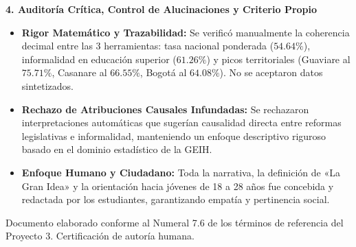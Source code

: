 \documentclass[10pt,letterpaper]{article}
\begin{document}
\vspace{2pt}

{\color{navy}\fontsize{10pt}{12pt}\selectfont \textbf{4. Auditoría Crítica, Control de Alucinaciones y Criterio Propio}}
\vspace{1pt}

\begin{itemize}[leftmargin=12pt,itemsep=1pt,topsep=1pt]
  \itemsep 1pt
  \item {\fontsize{8pt}{10pt}\selectfont \textbf{Rigor Matemático y Trazabilidad:} Se verificó manualmente la coherencia decimal entre las 3 herramientas: tasa nacional ponderada ($54.64\%$), informalidad en educación superior ($61.26\%$) y picos territoriales (Guaviare al $75.71\%$, Casanare al $66.55\%$, Bogotá al $64.08\%$). No se aceptaron datos sintetizados.}
  \item {\fontsize{8pt}{10pt}\selectfont \textbf{Rechazo de Atribuciones Causales Infundadas:} Se rechazaron interpretaciones automáticas que sugerían causalidad directa entre reformas legislativas e informalidad, manteniendo un enfoque descriptivo riguroso basado en el dominio estadístico de la GEIH.}
  \item {\fontsize{8pt}{10pt}\selectfont \textbf{Enfoque Humano y Ciudadano:} Toda la narrativa, la definición de «La Gran Idea» y la orientación hacia jóvenes de 18 a 28 años fue concebida y redactada por los estudiantes, garantizando empatía y pertinencia social.}
\end{itemize}

\vfill
\begin{center}
  {\fontsize{7.5pt}{9pt}\selectfont \color{slate} Documento elaborado conforme al Numeral 7.6 de los términos de referencia del Proyecto 3. Certificación de autoría humana.}
\end{center}
\end{document}
